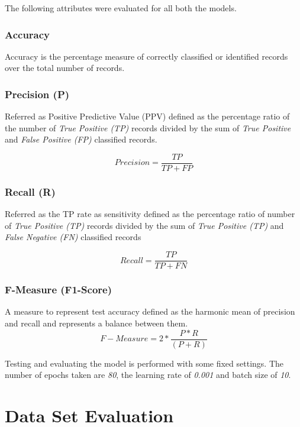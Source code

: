 \documentclass[12pt, a4paper]{report}
\begin{document}
The following attributes were evaluated for all both the models.\\

\subsubsection{Accuracy}
Accuracy is the percentage measure of correctly classified or identified records over the total number of records.\\

\subsubsection{Precision (P)}
Referred as Positive Predictive Value (PPV)  defined as the percentage ratio of the number of \textit{True Positive (TP)} records divided by the sum of \textit{True Positive} and \textit{False Positive (FP)} classified records.\\ \par
\begin{equation}
Precision = \frac{TP}{TP+FP}
\end{equation}

\subsubsection{Recall (R)}

Referred as the TP rate as sensitivity defined as the percentage ratio of number of \textit{True Positive (TP)} records divided by the sum of \textit{True Positive (TP)} and \textit{False Negative (FN)} classified records

\begin{equation}
Recall = \frac{TP}{TP+FN}
\end{equation}

\subsubsection{F-Measure (F1-Score)}
A measure to represent test accuracy defined as the harmonic mean of precision and recall and represents a balance between them.
\begin{equation}
F-Measure =	2*\frac{P*R}{(P+R)}
\end{equation}

Testing and evaluating the model is performed with some fixed settings. The number of epochs taken are \textit{80}, the learning rate of \textit{0.001} and batch size of \textit{10}. 
\clearpage
\section {Data Set Evaluation}\label{sec:datasetEvaluation}
\end{document}
